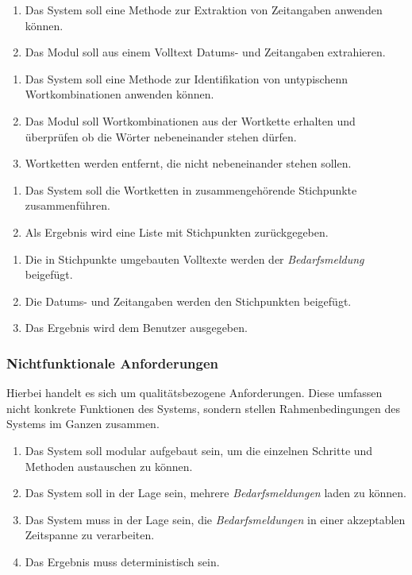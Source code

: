 \begin{enumerate}[label=5.\arabic*]
	\item Das System soll eine Methode zur Extraktion von Zeitangaben anwenden können.
	\item Das Modul soll aus einem Volltext Datums- und Zeitangaben extrahieren.
\end{enumerate}
\begin{enumerate}[label=6.\arabic*]
	\item Das System soll eine Methode zur Identifikation von untypischenn Wortkombinationen anwenden können.
	\item Das Modul soll Wortkombinationen aus der Wortkette erhalten und überprüfen ob die Wörter nebeneinander stehen dürfen.
	\item Wortketten werden entfernt, die nicht nebeneinander stehen sollen.
\end{enumerate}
\begin{enumerate}[label=7.\arabic*]
	\item Das System soll die Wortketten in zusammengehörende Stichpunkte zusammenführen.
	\item Als Ergebnis wird eine Liste mit Stichpunkten zurückgegeben.
\end{enumerate}
\begin{enumerate}[label=8.\arabic*]
	\item Die in Stichpunkte umgebauten Volltexte werden der \emph{Bedarfsmeldung} beigefügt.
	\item Die Datums- und Zeitangaben werden den Stichpunkten beigefügt.
	\item Das Ergebnis wird dem Benutzer ausgegeben.
\end{enumerate}
\subsubsection{Nichtfunktionale Anforderungen}
Hierbei handelt es sich um qualitätsbezogene Anforderungen. Diese umfassen nicht konkrete Funktionen des Systems, sondern stellen Rahmenbedingungen des Systems im Ganzen zusammen.
\begin{enumerate}
	\item Das System soll modular aufgebaut sein, um die einzelnen Schritte und Methoden austauschen zu können.
	\item Das System soll in der Lage sein, mehrere \emph{Bedarfsmeldungen} laden zu können.
	\item Das System muss in der Lage sein, die \emph{Bedarfsmeldungen} in einer akzeptablen Zeitspanne zu verarbeiten.
	\item Das Ergebnis muss deterministisch sein.
\end{enumerate}
